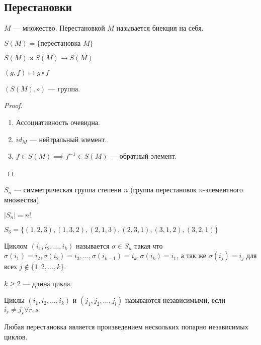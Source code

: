 \subsection{Перестановки}

\begin{defn}
    $M$ --- множество. Перестановкой $M$ называется биекция на себя.

    $S(M) = \{ \text{перестановка } M \}$

    $S(M) \times S(M) \to S(M)$

    $(g, f) \mapsto g \circ f$
\end{defn}

\begin{theorem-non}
    $(S(M), \circ)$ --- группа.
\end{theorem-non}

\begin{proof}
    \begin{enumerate}
        \item Ассоциативность очевидна.
        
        \item $id_M$ --- нейтральный элемент.
        
        \item $f \in S(M) \implies f^{-1} \in S(M)$ --- обратный элемент.
    \end{enumerate}
\end{proof}

\begin{defn}
    $S_n$ --- симметрическая группа степени $n$ (группа перестановок $n$-элементного множества)
\end{defn}

\begin{notice}
    $|S_n| = n!$
\end{notice}

\begin{example}
    $S_3 = \{ (1, 2, 3), (1, 3, 2), (2, 1, 3), (2, 3, 1), (3, 1, 2), (3, 2, 1) \}$
\end{example}

\begin{defn}
    Циклом $(i_1, i_2, \ldots, i_k)$ называется $\sigma \in S_n$ такая что $\sigma(i_1) = i_2, \sigma(i_2) = i_3, \ldots, \sigma(i_{k - 1}) = i_k, \sigma(i_k) = i_1$, а так же $\sigma(i_j) = i_j$ для всех $j \notin \{ 1, 2, \ldots, k \}$.

    $k \geq 2$ --- длина цикла.
\end{defn}

\begin{defn}
    Циклы $(i_1, i_2, \ldots, i_k)$ и $(j_1, j_2, \ldots, j_l)$ называются независимыми, если $i_r \neq j_s \forall r,s$
\end{defn}

\begin{theorem-non}
    Любая перестановка является произведением нескольких попарно независимых циклов.
\end{theorem-non}